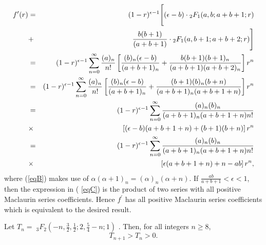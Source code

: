 \documentclass[final]{siamltex}
\begin{document}
\begin{eqnarray}
f^{\prime }(r) &=&(1-r)^{\epsilon -1}\Bigg[ (\epsilon -b)\cdot
{}_{2}F_{1}(a,b;a+b+1;r) \nonumber \\
&+& \frac{b(b+1)}{(a+b+1)}\cdot
{}_{2}F_{1}(a,b+1;a+b+2;r)\Bigg] \nonumber \\
&=&(1-r)^{\epsilon -1}\sum_{n=0}^{\infty }\frac{(a)_{n}}{n!}\left[ \frac{%
(b)_{n}(\epsilon -b)}{(a+b+1)_{n}}
+ \frac{b(b+1)(b+1)_{n}}{(a+b+1)(a+b+2)_{n}}\right] r^{n} \nonumber \\
&=&(1-r)^{\epsilon -1}\sum_{n=0}^{\infty }\frac{(a)_{n}}{n!}\left[ \frac{%
(b)_{n}(\epsilon -b)}{(a+b+1)_{n}}  
+ \frac{(b+1)(b)_{n}(b+n)}{(a+b+1)_{n}(a+b+1+n)}\right] r^{n}  \label{eqB} \\
&=&(1-r)^{\epsilon -1}\sum_{n=0}^{\infty }\frac{(a)_{n}(b)_{n}}{%
(a+b+1)_{n}(a+b+1+n)n!} \nonumber \\
&\times & \left[ (\epsilon -b)(a+b+1+n)+(b+1)(b+n)\right] r^{n} \nonumber \\
&=&(1-r)^{\epsilon -1}\sum_{n=0}^{\infty }\frac{(a)_{n}(b)_{n}}{%
(a+b+1)_{n}(a+b+1+n)n!} \label{eqC}\\ 
&\times &\left[ \epsilon (a+b+1+n)+n-ab\right] r^{n}, \nonumber
\end{eqnarray}
where (\ref{eqB}) makes use of $\alpha (\alpha +1)_{n}=(\alpha )_{n}(\alpha
+n)$. \noindent If $\frac{ab}{a+b+1}<\epsilon <1$, then the expression in (%
\ref{eqC}) is the product of two series with all positive Maclaurin series
coefficients. Hence $f^{\prime }$ has all positive Maclaurin series
coefficients which is equivalent to the desired result.
\qquad\endproof

\begin{corollary}\label{integers}
Let $T_{n}=\;{}_{3}F_{2}\left( -n,%
\mbox{$\frac{3}{2}$},\mbox{$\frac{1}{2}$};2,\mbox{$\frac{5}{4}$}-n;1\right) $%
. Then, for all integers $n\geq 8$, 
\[
T_{n+1}>T_{n}>0. 
\]
\end{corollary}
\end{document}
